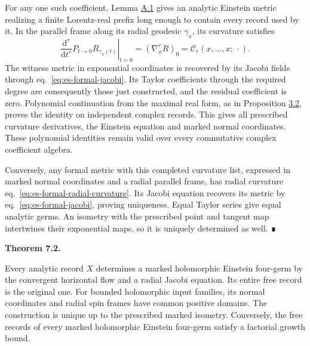 \documentclass[
  english,
  11pt,
  reqno]{amsart}
\makeatletter
\newcommand{\pandocstatementheading}[1]{%
  \par\addpenalty{\@beginparpenalty}%
  \addvspace{.5\baselineskip plus .2\baselineskip minus .2\baselineskip}%
  {\normalfont\bfseries #1\par}%
  \nobreak\@afterindenttrue\@afterheading
}
\makeatother
\begin{document}
For any one such coefficient, Lemma
\hyperref[lem:es-finite-witness]{A.1} gives an analytic Einstein metric
realizing a finite Lorentz-real prefix long enough to contain every
record used by it. In the parallel frame along its radial geodesic
\(\gamma_x\), its curvature satisfies \[
 \left.\frac{\mathrm d^r}{\mathrm dt^r}
       P_{t\to0}R_{\gamma_x(t)}\right|_{t=0}
     =(\nabla_x^rR)_0=\mathcal C_r(x,\ldots,x;\,\cdot).
\] The witness metric in exponential coordinates is recovered by its
Jacobi fields through eq.~\ref{eq:es-formal-jacobi}. Its Taylor
coefficients through the required degree are consequently those just
constructed, and the residual coefficient is zero. Polynomial
continuation from the maximal real form, as in Proposition
\hyperref[prop:es-completion]{3.2}, proves the identity on independent
complex records. This gives all prescribed curvature derivatives, the
Einstein equation and marked normal coordinates. These polynomial
identities remain valid over every commutative complex coefficient
algebra.

Conversely, any formal metric with this completed curvature list,
expressed in marked normal coordinates and a radial parallel frame, has
radial curvature eq.~\ref{eq:es-formal-radial-curvature}. Its Jacobi
equation recovers its metric by eq.~\ref{eq:es-formal-jacobi}, proving
uniqueness. Equal Taylor series give equal analytic germs. An isometry
with the prescribed point and tangent map intertwines their exponential
maps, so it is uniquely determined as well. ∎

\pandocstatementheading{\protect{}\label{thm:es-realization}Theorem 7.2.}

Every analytic record \(X\) determines a marked holomorphic Einstein
four-germ by the convergent horizontal flow and a radial Jacobi
equation. Its entire free record is the original one. For bounded
holomorphic input families, its normal coordinates and radial spin
frames have common positive domains. The construction is unique up to
the prescribed marked isometry. Conversely, the free records of every
marked holomorphic Einstein four-germ satisfy a factorial growth bound.
\end{document}
